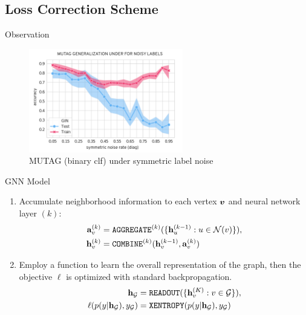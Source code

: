 \documentclass{beamer}
\begin{document}
    \subsection{Loss Correction Scheme}

    \begin{frame}{Observation}
        \begin{figure}
            \centering
            \includegraphics[width=0.6\textwidth]{imgs/MUTAG_noisy_training}
            \caption{MUTAG (binary clf) under symmetric label noise}
            \label{fig:mutag}
        \end{figure}
    \end{frame}

    \begin{frame}{GNN Model}
        \begin{enumerate}
          \item Accumulate neighborhood information to each vertex ${\bm{v}}$ and neural network layer $(k)$:
        \vspace{-0.5em}
        \begin{equation*}
          \begin{split}
        {\mathbf{a}}^{(k)}_{v} & = \texttt{AGGREGATE}^{(k)} (\{{\mathbf{h}}^{(k-1)}_u: u \in \mathcal{N}(v)\}), \\
        {\mathbf{h}}^{(k)}_v & = \texttt{COMBINE}^{(k)} ({\mathbf{h}}_v^{(k-1)}, {\mathbf{a}}_v^{(k)})
          \end{split}
        \end{equation*}

          \item Employ a function to learn the overall representation of the graph, then the objective $\ell$ is optimized with standard backpropagation.
          \vspace{-0.5em}
        \begin{equation*}
          \begin{split}
        {\mathbf{h}}_{{\mathcal{G}}} & = \texttt{READOUT} (\{{\mathbf{h}}^{(K)}_v: v \in {\mathcal{G}}\}), \\
        \ell(p(y|{\mathbf{h}}_{\mathcal{G}}), y_{\mathcal{G}}) & = \texttt{XENTROPY} (p(y|{\mathbf{h}}_{\mathcal{G}}), y_{\mathcal{G}})
          \end{split}
        \end{equation*}
        \end{enumerate}
    \end{frame}
\end{document}

